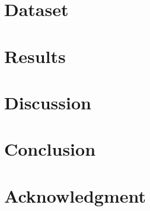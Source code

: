 \documentclass[10pt, conference, compsocconf]{IEEEtran}
\begin{document}

\section{Dataset}



\section{Results}


\section{Discussion}




\section{Conclusion}


\section*{Acknowledgment}



\end{document}
